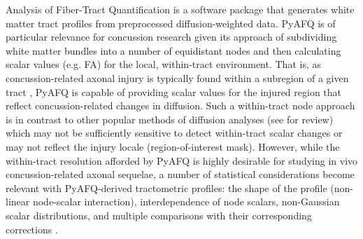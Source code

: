 \documentclass[12pt]{article}
\begin{document}
Analysis of Fiber-Tract Quantification \parencite[PyAFQ;][]{yeatman2012TractProfilesWhite,kruper2021EvaluatingReliabilityHuman,kruper2024TractometryHumanConnectome} is a software package that generates white matter tract profiles from preprocessed diffusion-weighted data. PyAFQ is of particular relevance for concussion research given its approach of subdividing white matter bundles into a number of equidistant nodes and then calculating scalar values (e.g. FA) for the local, within-tract environment. That is, as concussion-related axonal injury is typically found within a subregion of a given tract \parencite[e.g. parasagittal splenium;][]{jang2020DiagnosticProblemsDiffuse,johnson2013AxonalPathologyTraumatic,lindsey2023DiffusionWeightedImagingMild}, PyAFQ is capable of providing scalar values for the injured region that reflect concussion-related changes in diffusion. Such a within-tract node approach is in contrast to other popular methods of diffusion analyses (see \textcite{lindsey2023DiffusionWeightedImagingMild} for review) which may not be sufficiently sensitive to detect within-tract scalar changes \parencite[e.g. whole-tract or skeletal analyses;][]{smith2006TractbasedSpatialStatistics,fischl2012FreeSurfer} or may not reflect the injury locale (region-of-interest mask). However, while the within-tract resolution afforded by PyAFQ is highly desirable for studying in vivo concussion-related axonal sequelae, a number of statistical considerations become relevant with PyAFQ-derived tractometric profiles: the shape of the profile (non-linear node-scalar interaction), interdependence of node scalars, non-Gaussian scalar distributions, and multiple comparisons with their corresponding corrections \parencite{muncy2022GeneralAdditiveModels,richie-halford2021MultidimensionalAnalysisDetection}.
\end{document}
